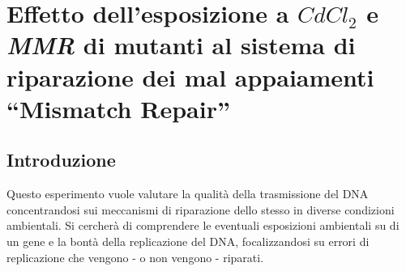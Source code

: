 \section*{Effetto dell'esposizione a \emph{$CdCl_{2}$} e \emph{MMR} di mutanti al sistema di riparazione dei mal appaiamenti ``Mismatch Repair''}

	\subsection*{Introduzione}
	Questo esperimento vuole valutare la qualità della trasmissione del DNA concentrandosi sui meccanismi di riparazione dello stesso in diverse condizioni ambientali.
	Si cercherà di comprendere le eventuali esposizioni ambientali su di un gene e la bontà della replicazione del DNA, focalizzandosi su errori di replicazione che vengono - o non vengono - riparati. 

 
